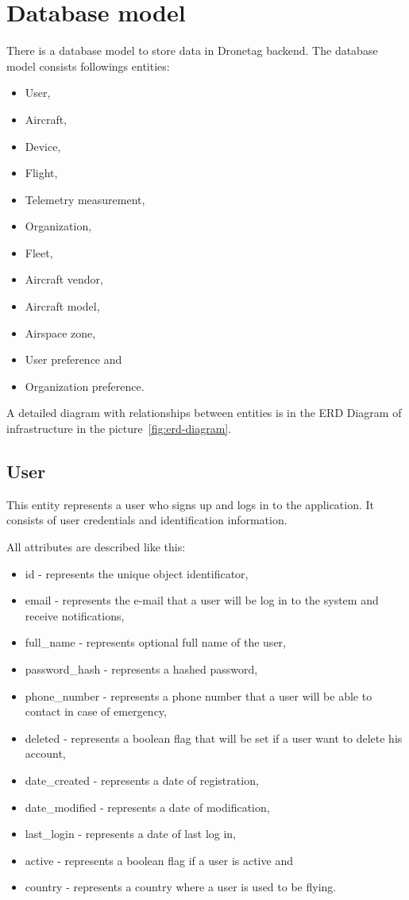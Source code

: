 \section{Database model}\label{sec:database-model}
There is a database model to store data in Dronetag backend.
The database model consists followings entities:
\begin{itemize}
    \item User,
    \item Aircraft,
    \item Device,
    \item Flight,
    \item Telemetry measurement,
    \item Organization,
    \item Fleet,
    \item Aircraft vendor,
    \item Aircraft model,
    \item Airspace zone,
    \item User preference and
    \item Organization preference.
\end{itemize}
A detailed diagram with relationships between entities is in the ERD Diagram of infrastructure in the picture~\ref{fig:erd-diagram}.

\subsection{User}\label{subsec:user}
This entity represents a user who signs up and logs in to the application.
It consists of user credentials and identification information.

All attributes are described like this:
\begin{itemize}
    \item id - represents the unique object identificator,
    \item email - represents the e-mail that a user will be log in to the system and receive notifications,
    \item full\_name - represents optional full name of the user,
    \item password\_hash - represents a hashed password,
    \item phone\_number - represents a phone number that a user will be able to contact in case of emergency,
    \item deleted - represents a boolean flag that will be set if a user want to delete his account,
    \item date\_created - represents a date of registration,
    \item date\_modified - represents a date of modification,
    \item last\_login - represents a date of last log in,
    \item active - represents a boolean flag if a user is active and
    \item country - represents a country where a user is used to be flying.
\end{itemize}

